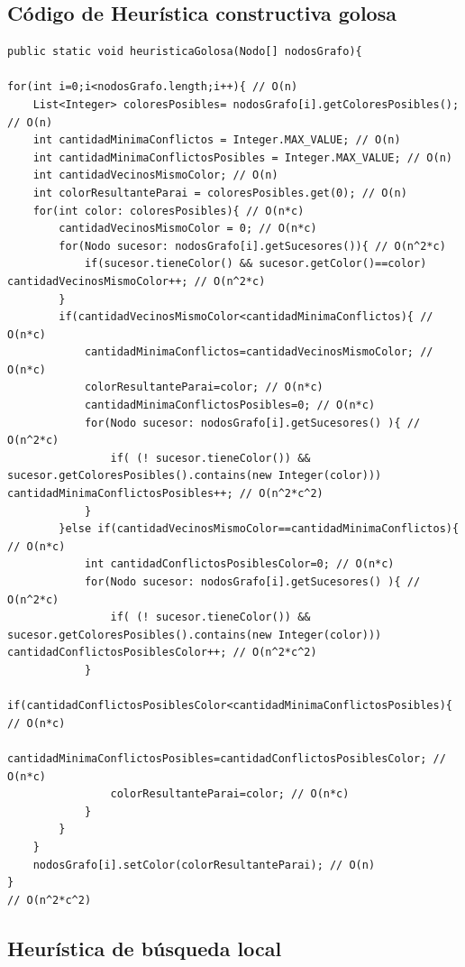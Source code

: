 \documentclass[a4paper]{article}
\begin{document}
\newpage
\subsection{Código de Heurística constructiva golosa}

\begin{lstlisting}
public static void heuristicaGolosa(Nodo[] nodosGrafo){
		
for(int i=0;i<nodosGrafo.length;i++){ // O(n)
	List<Integer> coloresPosibles= nodosGrafo[i].getColoresPosibles(); // O(n)
	int cantidadMinimaConflictos = Integer.MAX_VALUE; // O(n)
	int cantidadMinimaConflictosPosibles = Integer.MAX_VALUE; // O(n)
	int cantidadVecinosMismoColor; // O(n)
	int colorResultanteParai = coloresPosibles.get(0); // O(n)
	for(int color: coloresPosibles){ // O(n*c)
		cantidadVecinosMismoColor = 0; // O(n*c)
		for(Nodo sucesor: nodosGrafo[i].getSucesores()){ // O(n^2*c)	
			if(sucesor.tieneColor() && sucesor.getColor()==color) cantidadVecinosMismoColor++; // O(n^2*c)
		}
		if(cantidadVecinosMismoColor<cantidadMinimaConflictos){ // O(n*c)
			cantidadMinimaConflictos=cantidadVecinosMismoColor; // O(n*c)
			colorResultanteParai=color; // O(n*c)
			cantidadMinimaConflictosPosibles=0; // O(n*c)
			for(Nodo sucesor: nodosGrafo[i].getSucesores() ){ // O(n^2*c)
				if( (! sucesor.tieneColor()) && sucesor.getColoresPosibles().contains(new Integer(color))) cantidadMinimaConflictosPosibles++; // O(n^2*c^2)
			}	
		}else if(cantidadVecinosMismoColor==cantidadMinimaConflictos){ // O(n*c)
			int cantidadConflictosPosiblesColor=0; // O(n*c)
			for(Nodo sucesor: nodosGrafo[i].getSucesores() ){ // O(n^2*c)
				if( (! sucesor.tieneColor()) && sucesor.getColoresPosibles().contains(new Integer(color))) cantidadConflictosPosiblesColor++; // O(n^2*c^2)
			}
			if(cantidadConflictosPosiblesColor<cantidadMinimaConflictosPosibles){ // O(n*c)
				cantidadMinimaConflictosPosibles=cantidadConflictosPosiblesColor; // O(n*c)
				colorResultanteParai=color; // O(n*c)
			}
		}
	}
	nodosGrafo[i].setColor(colorResultanteParai); // O(n)
}
// O(n^2*c^2)
\end{lstlisting}

\newpage
\subsection{Heurística de búsqueda local}
\end{document}
